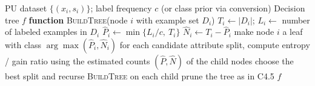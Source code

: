 \documentclass{article}
\begin{document}
\begin{algorithm}[!h]
\renewcommand{\algorithmicrequire}{\textbf{Input:}} %
\renewcommand{\algorithmicensure}{\textbf{Output:}} %
	\caption{POSC4.5} %
	\begin{algorithmic}[1] %
	    \REQUIRE
	    PU dataset $\{(x_i,s_i)\}$; label frequency $c$ (or class prior via conversion)
	    \ENSURE
	    Decision tree $f$
	    \STATE \textbf{function} \textsc{BuildTree}(node $i$ with example set $D_i$)
	    \STATE \quad $T_i\leftarrow |D_i|$; $L_i\leftarrow$ number of labeled examples in $D_i$
	    \STATE \quad $\hat{P}_i\leftarrow \min\{L_i/c,\ T_i\}$ %
	    \STATE \quad $\hat{N}_i\leftarrow T_i-\hat{P}_i$ %
	    \STATE make node $i$ a leaf with class $\arg\max(\hat{P}_i,\hat{N}_i)$
	    \ELSE
	    \STATE for each candidate attribute split, compute entropy / gain ratio using the estimated counts $(\hat{P},\hat{N})$ of the child nodes %
	    \STATE choose the best split and recurse \textsc{BuildTree} on each child
	    \ENDIF
	    \STATE prune the tree as in C4.5
		\RETURN $f$
	\end{algorithmic}
\end{algorithm}
\end{document}
